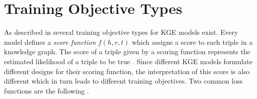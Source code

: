 \section{Training Objective Types} 
\label{sec:training_objective_types}

As described in \cite{cai2017kbgan} several training objective types for \ac{KGE} models exist.
Every model defines a \textit{score function} $f(h,r,t)$ which assigns a score to each triple  in a knowledge graph.
The score of a triple given by a scoring function represents the estimated likelihood of a triple to be true \cite{cai2017kbgan}.
Since different \ac{KGE} models formulate different designs for their scoring function, the interpretation of this score is also different which in turn leads to different training objectives.
Two common loss functions are the following \cite{cai2017kbgan}.
